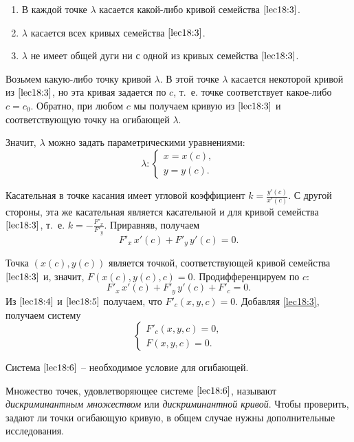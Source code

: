 \documentclass[../../main.tex]{subfiles}
\begin{document}
\begin{enumerate}
	\item В каждой точке $\lambda$ касается какой-либо кривой семейства 
	$\eqref{lec18:3}$.
	\item $\lambda$ касается всех кривых семейства $\eqref{lec18:3}$.
	\item $\lambda$ не имеет общей дуги ни с одной из кривых семейства 
	$\eqref{lec18:3}$.
\end{enumerate}

Возьмем какую-либо точку кривой $\lambda$. В этой точке $\lambda$ касается 
некоторой кривой из $\eqref{lec18:3}$, но эта кривая задается по $c$, 
т.~е. точке соответствует какое-либо $c = c_0$. Обратно, при любом $c$ мы 
получаем 
кривую из $\eqref{lec18:3}$ и соответствующую точку на огибающей $\lambda$.

Значит, $\lambda$ можно задать параметрическими уравнениями:
\[ \lambda: \begin{cases}
x=x\left( c \right), \\
y=y\left( c \right). 
\end{cases} \]

Касательная в точке касания имеет угловой коэффициент
$k = \frac{y' \left( c \right) }{ x' \left( c \right) }$.
С другой стороны, эта же касательная является касательной и для кривой 
семейства $\eqref{lec18:3}$, т.~е.
$k = - \frac{F'_x}{ F'_y}$.
Приравняв, получаем
\begin{equation}\label{lec18:4} F'_x\,x'(c) + F'_y\,y'(c) = 0.
\end{equation}

Точка $\left( x(c), y(c) \right) $ является точкой, 
соответствующей кривой семейства $\eqref{lec18:3}$ и, значит, $F(x(
c), y(c), c) = 0$.
Продифференцируем по $c$:
\begin{equation}\label{lec18:5} F'_x\, x'(c) + F'_y\,y'(c) + F'_c = 0. 
\end{equation}
Из $\eqref{lec18:4}$ и $\eqref{lec18:5}$ получаем, что $F'_c\left(x,y,c\right) 
= 0$. Добавляя \eqref{lec18:3}, получаем систему
\begin{equation}\label{lec18:6} \begin{cases}
F'_c\left(x,y,c\right) = 0,\\
F(x,y,c)  = 0.
\end{cases}  \end{equation}

Система $\eqref{lec18:6}$ \--- необходимое условие для огибающей.

Множество точек, удовлетворяющее системе $\eqref{lec18:6}$, называют 
\emph{дискриминантным множеством} или
\emph{дискриминантной кривой}.
Чтобы проверить, задают ли точки огибающую кривую, в общем случае нужны 
дополнительные исследования.
\end{document}

